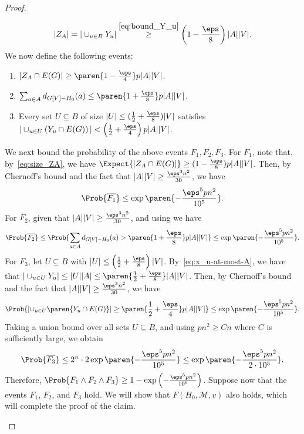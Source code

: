 \documentclass[10pt,a4paper,reqno]{amsart}
\begin{document}
\begin{proof}
\begin{claimproof}
\begin{equation}
    |Z_A| = |\cup_{u \in B} Y_u| \stackrel{\eqref{eq:bound_Y_u}}{\geq} \left(1 - \frac{\eps}{8}\right) |A| |V|.
\end{equation}
We now define the following events:
\begin{enumerate}[label = {$F_{\arabic*}$:}, leftmargin= \widthof{S000000}]
    \item\label{item:f1}
      $\left|Z_A \cap E(G)\right| \geq \paren{1 - \frac{\eps}{4}} p |A||V|$.
    \item\label{item:f2}
      $\sum_{a \in A} d_{G[V] - H_0}(a) \leq \paren{1 + \frac{\eps}{8}} p
      |A||V|$.
    \item\label{item:f3} Every set $U \subseteq B$ of size $|U| \leq (\frac{1}{2} + \frac{\eps}{8}) |V|$ satisfies $|\cup_{u \in U} \left( Y_u \cap E(G) \right)| < \left(\frac{1}{2} + \frac{\eps}{4} \right) p |A| |V|$.
\end{enumerate}
We next bound the probability of the above events $F_1, F_2, F_3$. For $F_1$, note that, by~\eqref{eq:size_ZA}, we have $\Expect{|Z_A \cap E(G)|} \geq (1 - \frac{\eps}{8}) p |A||V|$. Then, by Chernoff's bound and the fact that $|A||V| \geq \frac{\eps^3 n^2}{30}$, we have
\begin{equation*}
    \Prob{\overline{F_1}} \leq \exp\paren{-\frac{\eps^5 p n^2}{10^5}}.
\end{equation*}
For $F_2$, given that $|A||V| \geq \frac{\eps^3 n^2}{30}$, and using  we have
\begin{equation*}
    \Prob{\overline{F_2}} \leq \Prob{\sum_{a \in A} d_{G[V] - H_0}(a) > \paren{1 + \frac{\eps}{8}} p |A| |V|} \leq \exp\paren{-\frac{\eps^5 p n^2}{10^5}}.
\end{equation*}
For $F_3$, let $U \subseteq B$ with $|U| \leq \left(\frac{1}{2} + \frac{\eps}{8}\right)|V|$. By~\eqref{eq:x_u-at-most-A}, we have that $|\cup_{u \in U} Y_u| \leq |U| |A| \leq \paren{\frac{1}{2} + \frac{\eps}{8}} |A| |V|$.
Then, by Chernoff's bound and the fact that $|A||V| \geq \frac{\eps^3 n^2}{30}$, we have
\begin{equation*}
    \Prob{\left| \cup_{u \in U} \paren{Y_u \cap E(G)} \right| \geq \paren{\frac{1}{2} + \frac{\eps}{4}} p |A| |V|} \leq \exp\paren{-\frac{\eps^5 p n^2}{10^5}}.
\end{equation*}
Taking a union bound over all sets $U \subseteq B$, and using $pn^2\ge Cn$ where $C$ is sufficiently large, we obtain
\begin{equation*}
    \Prob{\overline{F_3}} \leq 2^n \cdot 2 \exp\paren{-\frac{\eps^5 p n^2}{10^5}} \leq \exp\paren{-\frac{\eps^5 pn^2}{2 \cdot 10^5}}.
\end{equation*}
Therefore, $\Prob{F_1 \land F_2 \land F_3} \geq 1 - \exp\left(-\frac{\eps^5 p n^2}{10^6}\right)$. Suppose now that the events $F_1$, $F_2$, and $F_3$ hold. We will show that $F(H_0, \mathcal{M}, v)$ also holds, which will complete the proof of the claim.


\end{claimproof}
\end{proof}
\end{document}
